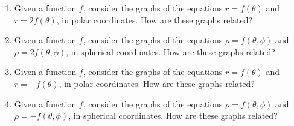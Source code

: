 \begin{problem}
\begin{enumerate}
\item Given a function $f$, consider the graphs of the equations $r = f(\theta)$ and $r = 2f(\theta)$, in polar coordinates. How are these graphs related?
\item Given a function $f$, consider the graphs of the equations $\rho = f(\theta, \phi)$ and $\rho = 2f(\theta, \phi)$, in spherical coordinates. How are these graphs related?
\item Given a function $f$, consider the graphs of the equations $r = f(\theta)$ and $r = -f(\theta)$, in polar coordinates. How are these graphs related?
\item Given a function $f$, consider the graphs of the equations $\rho = f(\theta, \phi)$ and $\rho = -f(\theta, \phi)$, in spherical coordinates. How are these graphs related?
\end{enumerate}
\end{problem}